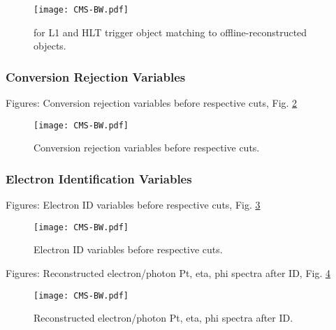  \begin{figure}[htb]
  \begin{center}
    \texttt{[image: CMS-BW.pdf]}
  \end{center}
  \caption[\DR for L1 and HLT trigger object matching to offline for electron selection]{\DR for L1 and HLT trigger object matching to offline-reconstructed objects.}
  \label{fig:TriggerObjectSelectionDeltaR}
 \end{figure}


\subsubsection{Conversion Rejection Variables}
Figures: Conversion rejection variables before respective cuts, Fig. \ref{fig:ConvRejVars}

 \begin{figure}[htb]
  \begin{center}
    \texttt{[image: CMS-BW.pdf]}
  \end{center}
  \caption[Conversion rejection variables before respective cuts]{Conversion rejection variables before respective cuts.}
  \label{fig:ConvRejVars}
 \end{figure}


\subsubsection{Electron Identification Variables}
Figures: Electron ID variables before respective cuts, Fig. \ref{fig:ElecIdVars}

 \begin{figure}[htb]
  \begin{center}
    \texttt{[image: CMS-BW.pdf]}
  \end{center}
  \caption[Electron ID variables before respective cuts]{Electron ID variables before respective cuts.}
  \label{fig:ElecIdVars}
 \end{figure}



Figures: Reconstructed electron/photon Pt, eta, phi spectra after ID, Fig. \ref{fig:RecoSpectraAfterEid}

 \begin{figure}[htb]
  \begin{center}
    \texttt{[image: CMS-BW.pdf]}
  \end{center}
  \caption[Reconstructed electron/photon Pt, eta, phi spectra after ID]{Reconstructed electron/photon Pt, eta, phi spectra after ID.}
  \label{fig:RecoSpectraAfterEid}
 \end{figure}


